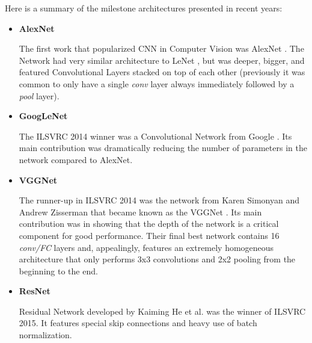 Here is a summary of the milestone architectures presented in recent years:

\begin{itemize}
	\item \textbf{AlexNet}
	
	The first work that popularized CNN in Computer Vision was AlexNet \cite{krizhevsky}. The Network had very similar architecture to LeNet \cite{lecun}, but was deeper, bigger, and featured Convolutional Layers stacked on top of each other (previously it was common to only have a single \textit{conv} layer always immediately followed by a \textit{pool} layer). \cite{stanford-github}
	
	\item \textbf{GoogLeNet}
	
	The ILSVRC 2014 winner was a Convolutional Network from Google \cite{szegedy}. Its main contribution was dramatically reducing the number of parameters in the network compared to AlexNet. \cite{stanford-github}
	
	\item \textbf{VGGNet}
	
	The runner-up in ILSVRC 2014 was the network from Karen Simonyan and Andrew Zisserman that became known as the VGGNet \cite{vgg}. Its main contribution was in showing that the depth of the network is a critical component for good performance. Their final best network contains 16 \textit{conv/FC} layers and, appealingly, features an extremely homogeneous architecture that only performs 3x3 convolutions and 2x2 pooling from the beginning to the end. \cite{stanford-github}
	
	\item \textbf{ResNet}
	
  	Residual Network developed by Kaiming He et al. \cite{resnet} was the winner of ILSVRC 2015. It features special skip connections and heavy use of batch normalization. \cite{stanford-github}
		 
\end{itemize}






